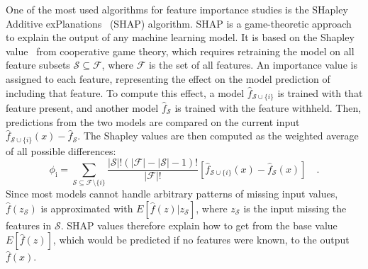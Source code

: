 One of the most used algorithms for feature importance studies is the SHapley Additive exPlanations~\cite{lundberg2017unified} (SHAP) algorithm. SHAP is a game-theoretic approach to explain the output of any machine learning model. It is based on the Shapley value~\cite{lipovetsky2001analysis} from cooperative game theory, which requires retraining the model on all feature subsets $\mathcal{S}\subseteq \mathcal{F}$, where $\mathcal{F}$ is the set of all features. An importance value is assigned to each feature, representing the effect on the model prediction of including that feature. To compute this effect, a model $\widehat{f}_{\mathcal{S}\cup\{i\}}$ is trained with that feature present, and another model $\widehat{f}_\mathcal{S}$ is trained with the feature withheld. Then, predictions from the two
models are compared on the current input \mbox{$\widehat{f}_{\mathcal{S}\cup\{i\}} (x) - \widehat{f}_\mathcal{S}$}. The Shapley values are then computed as the weighted average of all possible differences:
\begin{equation*}
    \phi_\mathrm{i} = \sum_{\mathcal{S}\subseteq \mathcal{F}\setminus\{i\}} \frac{|\mathcal{S}|!(|\mathcal{F}|-|\mathcal{S}|-1)!}{|\mathcal{F}|!} \left[\widehat{f}_{\mathcal{S}\cup\{i\}}(x) - \widehat{f}_\mathcal{S}(x)\right]\quad .
\end{equation*}
Since most models cannot handle arbitrary patterns of missing input values, $\widehat{f} (z_\mathcal{S})$ is approximated with $E[\widehat{f}(z) | z_\mathcal{S}]$, where $z_\mathcal{S}$ is the input missing the features in $\mathcal{S}$. SHAP values therefore explain how to get from the base value $E[\widehat{f}(z)]$, which would be predicted if no features were known, to the output $\widehat{f}(x)$.

